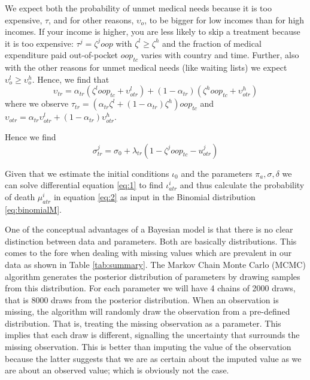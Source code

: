 \documentclass[a4paper,12pt]{article}
\begin{document}
We expect both the probability of unmet medical needs because it is too expensive, \(\tau\), and for other reasons, \(\upsilon_o\), to be bigger for low incomes than for high incomes. If your income is higher, you are less likely to skip a treatment because it is too expensive: \(\tau^j = \zeta^j oop\) with \(\zeta^l \geq \zeta^h\) and the fraction of medical expenditure paid out-of-pocket \(oop_{tc}\) varies with country and time. Further, also with the other reasons for unmet medical needs (like waiting lists) we expect \(\upsilon_o^l \geq \upsilon_o^h\). Hence, we find that
\begin{equation}
\label{eq:Unmet}
\upsilon_{tr} = \alpha_{tr} (\zeta^{l} oop_{tc} + \upsilon_{otr}^l) + (1-\alpha_{tr}) (\zeta^h oop_{tc} + \upsilon_{otr}^{h})
\end{equation}
where we observe \(\tau_{tr} = (\alpha_{tr} \zeta^l + (1-\alpha_{tr}) \zeta^h) oop_{tc}\) and \(\upsilon_{otr} = \alpha_{tr} \upsilon^l_{otr} + (1-\alpha_{tr}) \upsilon^h_{otr}\).

Hence we find
\begin{equation}
\label{eq:sigma}
\sigma_{tr}^{j} = \sigma_{0} + \lambda_{tr} (1-\zeta^j oop_{tc} - u_{otr}^{j})
\end{equation}

Given that we estimate the initial conditions \(\iota_0\) and the parameters \(\pi_a, \sigma, \delta\) we can solve differential equation \eqref{eq:1} to find \(\iota_{atr}^i\) and thus calculate the probability of death \(\mu_{atr}^i\) in equation \eqref{eq:2} as input in the Binomial distribution \eqref{eq:binomialM}.

One of the conceptual advantages of a Bayesian model is that there is no clear distinction between data and parameters. Both are basically distributions. This comes to the fore when dealing with missing values which are prevalent in our data as shown in Table \ref{tab:summary}. The Markov Chain Monte Carlo (MCMC) algorithm generates the posterior distribution of parameters by drawing samples from this distribution. For each parameter we will have 4 chains of 2000 draws, that is 8000 draws from the posterior distribution. When an observation is missing, the algorithm will randomly draw the observation from a pre-defined distribution. That is, treating the missing observation as a parameter. This implies that each draw is different, signalling the uncertainty that surrounds the missing observation. This is better than imputing the value of the observation because the latter suggests that we are as certain about the imputed value as we are about an observed value; which is obviously not the case.
\end{document}
